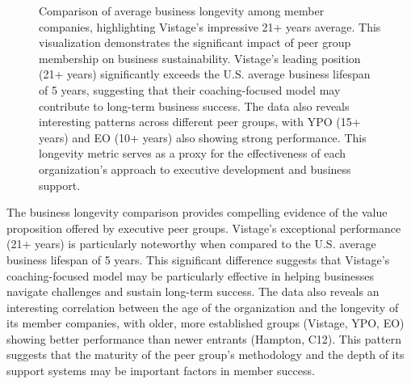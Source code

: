 \documentclass[conference]{IEEEtran}
\begin{document}
\begin{figure}[t]
\centering
{}
\caption{Comparison of average business longevity among member companies, highlighting Vistage's impressive 21+ years average. This visualization demonstrates the significant impact of peer group membership on business sustainability. Vistage's leading position (21+ years) significantly exceeds the U.S. average business lifespan of 5 years, suggesting that their coaching-focused model may contribute to long-term business success. The data also reveals interesting patterns across different peer groups, with YPO (15+ years) and EO (10+ years) also showing strong performance. This longevity metric serves as a proxy for the effectiveness of each organization's approach to executive development and business support.}
\label{fig:longevity_comparison}
\end{figure}

The business longevity comparison provides compelling evidence of the value proposition offered by executive peer groups. Vistage's exceptional performance (21+ years) is particularly noteworthy when compared to the U.S. average business lifespan of 5 years. This significant difference suggests that Vistage's coaching-focused model may be particularly effective in helping businesses navigate challenges and sustain long-term success. The data also reveals an interesting correlation between the age of the organization and the longevity of its member companies, with older, more established groups (Vistage, YPO, EO) showing better performance than newer entrants (Hampton, C12). This pattern suggests that the maturity of the peer group's methodology and the depth of its support systems may be important factors in member success.
\end{document}
